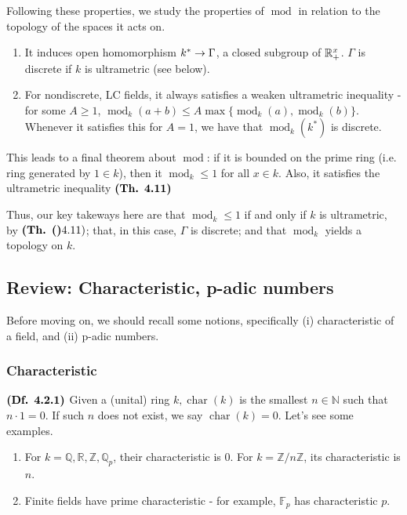 \documentclass{article}
\DeclareMathOperator{\modl}{mod}
\DeclareMathOperator{\chars}{char}
\begin{document}
Following these properties, we study the properties of $\modl$ in relation to the topology of the spaces it acts on.

\begin{enumerate}
    \item It induces open homomorphism $k^* \rightarrow \Gamma$, a closed subgroup of $\mathbb{R}_+^x$. $\Gamma$ is discrete if $k$ is ultrametric (see below).
    
    \item For nondiscrete, LC fields, it always satisfies a weaken ultrametric inequality - for some $A \geq 1$, $\modl_k(a+b) \leq A\max\{\modl_k(a),\modl_k(b)\}$. Whenever it satisfies this for $A = 1$, we have that $\modl_k(k^*)$ is discrete.
\end{enumerate}

This leads to a final theorem about $\modl$: if it is bounded on the prime ring (i.e. ring generated by $1 \in k$), then it $\modl_k \leq 1$ for all $x \in k$. Also, it satisfies the ultrametric inequality $\textbf{(Th. 4.11)}$

Thus, our key takeways here are that $\modl_k \leq 1$ if and only if $k$ is ultrametric, by $\textbf{(Th. ()}4.11)$; that, in this case, $\Gamma$ is discrete; and that $\modl_k$ yields a topology on $k$.

\subsection{Review: Characteristic, p-adic numbers}
Before moving on, we should recall some notions, specifically (i) characteristic of a field, and (ii) p-adic numbers.

\subsubsection*{Characteristic}
$\textbf{(Df. 4.2.1)}$ Given a (unital) ring $k, \chars(k)$ is the smallest $n \in \mathbb{N}$ such that $n \cdot 1 = 0$. If such $n$ does not exist, we say $\chars(k) = 0$. Let's see some examples.

\begin{enumerate}
    \item For $k = \mathbb{Q}, \mathbb{R}, \mathbb{Z}, \mathbb{Q}_p$, their characteristic is 0. For $k = \mathbb{Z}/n\mathbb{Z}$, its characteristic is $n$. 
    \item Finite fields have prime characteristic - for example, $\mathbb{F}_p$ has characteristic $p$.
\end{enumerate}
\end{document}
